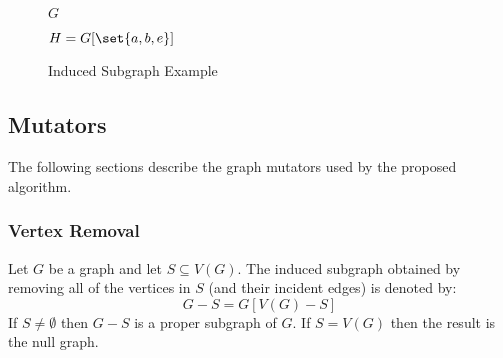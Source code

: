 \begin{figure}[h]
  \label{fig:induced}
  \begin{minipage}{3in}
    \begin{center}

      \bigskip

      \(G\)
    \end{center}
  \end{minipage}
  \begin{minipage}{3in}
    \begin{center}

      \bigskip

      \(H=G[\set{a,b,e}]\)
    \end{center}
  \end{minipage}
  \caption{Induced Subgraph Example}
\end{figure}

\subsection{Mutators}

The following sections describe the graph mutators used by the proposed algorithm.

\subsubsection{Vertex Removal}

Let \(G\) be a graph and let \(S\subseteq V(G)\).  The induced subgraph obtained by removing all of the vertices in
\(S\) (and their incident edges) is denoted by:
\[G-S=G[V(G)-S]\]
If \(S\ne\emptyset\) then \(G-S\) is a proper subgraph of \(G\).  If \(S=V(G)\) then the result is the null graph.

